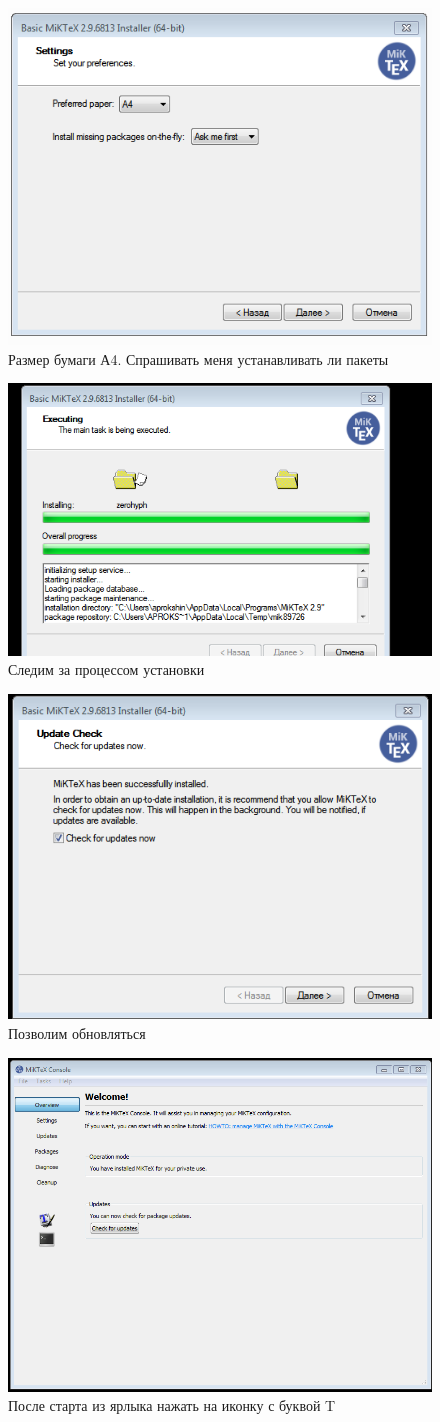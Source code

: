 \documentclass[a4paper,11pt]{article}
\begin{document}
\begin{figure}[!ht]
\centering
\caption{Размер бумаги А4. Спрашивать меня устанавливать ли пакеты}
\includegraphics[width=0.48\linewidth]{miktex5.png}
\end{figure}
\begin{figure}[!ht]
\centering
\caption{Следим за процессом установки}
\includegraphics[width=0.48\linewidth]{miktex6.png}
\end{figure}
\begin{figure}[!ht]
\centering
\caption{Позволим обновляться}
\includegraphics[width=0.48\linewidth]{miktex8.png}
\end{figure}
\begin{figure}[!ht]
\centering
\caption{После старта из ярлыка нажать на иконку с буквой T}
\includegraphics[width=0.48\linewidth]{miktex9.png}
\end{figure}
\end{document}
